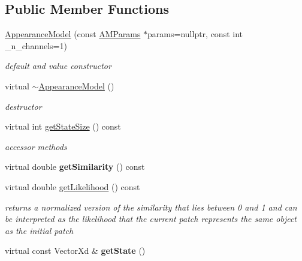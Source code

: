 \subsection*{Public Member Functions}
\begin{DoxyCompactItemize}
\item 
\hypertarget{classAppearanceModel_a0b0eeb5779fa227bffd356c9562fc583}{\hyperlink{classAppearanceModel_a0b0eeb5779fa227bffd356c9562fc583}{Appearance\-Model} (const \hyperlink{structAMParams}{A\-M\-Params} $\ast$params=nullptr, const int \-\_\-n\-\_\-channels=1)}\label{classAppearanceModel_a0b0eeb5779fa227bffd356c9562fc583}

\begin{DoxyCompactList}\small\item\em default and value constructor \end{DoxyCompactList}\item 
\hypertarget{classAppearanceModel_a457d2fefd61966035659a8212da93017}{virtual \hyperlink{classAppearanceModel_a457d2fefd61966035659a8212da93017}{$\sim$\-Appearance\-Model} ()}\label{classAppearanceModel_a457d2fefd61966035659a8212da93017}

\begin{DoxyCompactList}\small\item\em destructor \end{DoxyCompactList}\item 
\hypertarget{classAppearanceModel_af1c127fe00057b7674502885071c586d}{virtual int \hyperlink{classAppearanceModel_af1c127fe00057b7674502885071c586d}{get\-State\-Size} () const }\label{classAppearanceModel_af1c127fe00057b7674502885071c586d}

\begin{DoxyCompactList}\small\item\em accessor methods \end{DoxyCompactList}\item 
\hypertarget{classAppearanceModel_abf2f3cd69c2ac981c842b7ae0fe2fbef}{virtual double {\bfseries get\-Similarity} () const }\label{classAppearanceModel_abf2f3cd69c2ac981c842b7ae0fe2fbef}

\item 
\hypertarget{classAppearanceModel_a2486d4c5b7aeccf7b1b41c29f7a27099}{virtual double \hyperlink{classAppearanceModel_a2486d4c5b7aeccf7b1b41c29f7a27099}{get\-Likelihood} () const }\label{classAppearanceModel_a2486d4c5b7aeccf7b1b41c29f7a27099}

\begin{DoxyCompactList}\small\item\em returns a normalized version of the similarity that lies between 0 and 1 and can be interpreted as the likelihood that the current patch represents the same object as the initial patch \end{DoxyCompactList}\item 
\hypertarget{classAppearanceModel_a118172fa91ad6a85b2bfb22cb97ce8f8}{virtual const Vector\-Xd \& {\bfseries get\-State} ()}\label{classAppearanceModel_a118172fa91ad6a85b2bfb22cb97ce8f8}


\end{DoxyCompactItemize}
